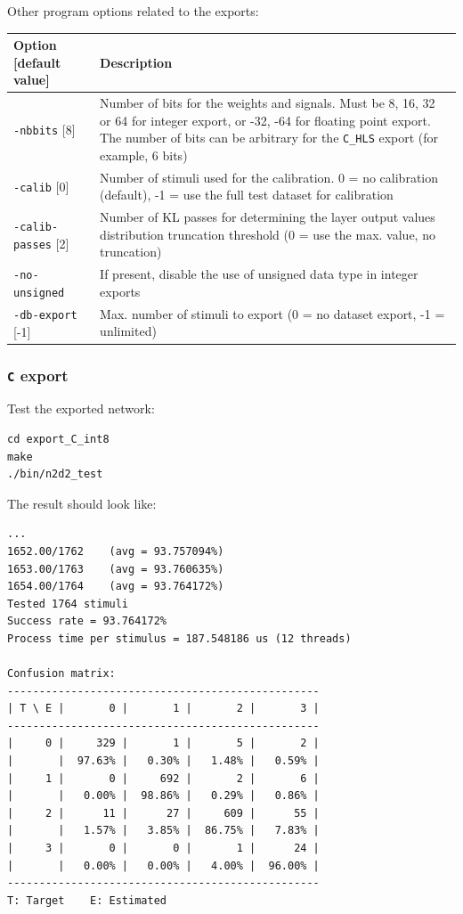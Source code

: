 \documentclass[a4paper,11pt,oneside]{article}
\newcommand{\iponly}{\reversemarginpar
    \marginnote{\color{listletiblue}\normalfont\scriptsize
    {\ttfamily{}\hyperref[sec:N2D2-IP]{\color{listletiblue}N2D2 IP}} \emph{only}}}
\begin{document}
Other program options related to the exports:
\begin{center}
 \begin{tabular}{| p{5cm} | p{10cm} | }
 \hline
 Option [default value] & Description\\
 \hline\hline
  \lstinline!-nbbits! [8] & Number of bits for the weights and signals.
  Must be 8, 16, 32 or 64 for integer export, or -32, -64 for floating
  point export. The number of bits can be arbitrary for the \lstinline!C_HLS!
  export (for example, 6 bits) \\
  \lstinline!-calib! [0] & Number of stimuli used for the calibration.
  0 = no calibration (default),
  -1 = use the full test dataset for calibration \\
  \lstinline!-calib-passes! [2] & Number of KL passes for determining the layer
  output values distribution truncation threshold (0 = use the max. value,
  no truncation) \\
  \lstinline!-no-unsigned! & If present, disable the use of unsigned data type
  in integer exports \\
  \lstinline!-db-export! [-1] & Max. number of stimuli to export
  (0 = no dataset export, -1 = unlimited) \\
 \hline
\end{tabular}
\end{center}

\subsubsection{\texorpdfstring{%
\lstinline[basicstyle=\ttfamily\bfseries]!C! export\protect\iponly}{C export}}

Test the exported network:
\begin{lstlisting}
cd export_C_int8
make
./bin/n2d2_test
\end{lstlisting}

The result should look like:
\begin{lstlisting}[style=console]
...
1652.00/1762    (avg = 93.757094%)
1653.00/1763    (avg = 93.760635%)
1654.00/1764    (avg = 93.764172%)
Tested 1764 stimuli
Success rate = 93.764172%
Process time per stimulus = 187.548186 us (12 threads)

Confusion matrix:
-------------------------------------------------
| T \ E |       0 |       1 |       2 |       3 |
-------------------------------------------------
|     0 |     329 |       1 |       5 |       2 |
|       |  97.63% |   0.30% |   1.48% |   0.59% |
|     1 |       0 |     692 |       2 |       6 |
|       |   0.00% |  98.86% |   0.29% |   0.86% |
|     2 |      11 |      27 |     609 |      55 |
|       |   1.57% |   3.85% |  86.75% |   7.83% |
|     3 |       0 |       0 |       1 |      24 |
|       |   0.00% |   0.00% |   4.00% |  96.00% |
-------------------------------------------------
T: Target    E: Estimated
\end{lstlisting}
\end{document}
